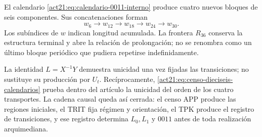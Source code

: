 El calendario \eqref{act21:eq:calendario-0011-interno} produce cuatro nuevos
bloques de seis componentes. Sus concatenaciones forman
\[
 w_6\longrightarrow w_{12}\longrightarrow w_{18}
 \longrightarrow w_{24}\longrightarrow w_{30}.
\]
Los subíndices de \(w\) indican longitud acumulada. La frontera \(R_{36}\) conserva la estructura terminal y abre la relación de prolongación; no se renombra como un último bloque periódico que pudiera repetirse indefinidamente.

La identidad \(L=X^{-1}Y\) demuestra unicidad una vez fijadas las
transiciones; no sustituye su producción por \(U_t\). Recíprocamente,
\eqref{act21:eq:censo-dieciseis-calendarios} prueba dentro del artículo la unicidad
del orden de los cuatro transportes. La cadena causal queda así cerrada:
el censo APP produce las regiones iniciales, el TRIT fija régimen y
orientación, el TPK produce el registro de transiciones, y ese registro
determina \(L_0,L_1\) y \(0011\) antes de toda realización arquimediana.


\par\endgroup
